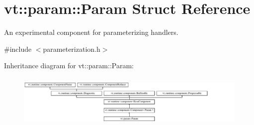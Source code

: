 \hypertarget{structvt_1_1param_1_1_param}{}\section{vt\+:\+:param\+:\+:Param Struct Reference}
\label{structvt_1_1param_1_1_param}


An experimental component for parameterizing handlers.  




{\ttfamily \#include $<$parameterization.\+h$>$}

Inheritance diagram for vt\+:\+:param\+:\+:Param\+:\begin{figure}[H]
\begin{center}
\leavevmode
\includegraphics[height=2.564103cm]{structvt_1_1param_1_1_param}
\end{center}
\end{figure}
